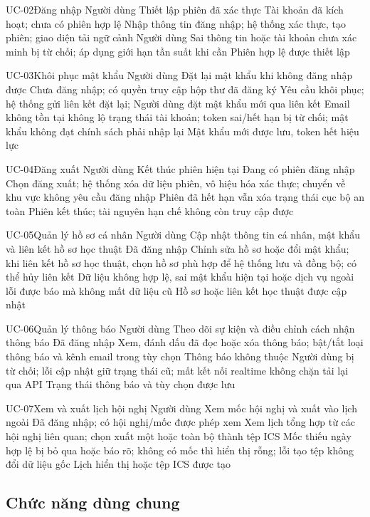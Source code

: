 \UseCaseSpec
{UC-02}{Đăng nhập}
{Người dùng}
{Thiết lập phiên đã xác thực}
{Tài khoản đã kích hoạt; chưa có phiên hợp lệ}
{Nhập thông tin đăng nhập; hệ thống xác thực, tạo phiên; giao diện tải ngữ cảnh Người dùng}
{Sai thông tin hoặc tài khoản chưa xác minh bị từ chối; áp dụng giới hạn tần suất khi cần}
{Phiên hợp lệ được thiết lập}

\UseCaseSpec
{UC-03}{Khôi phục mật khẩu}
{Người dùng}
{Đặt lại mật khẩu khi không đăng nhập được}
{Chưa đăng nhập; có quyền truy cập hộp thư đã đăng ký}
{Yêu cầu khôi phục; hệ thống gửi liên kết đặt lại; Người dùng đặt mật khẩu mới qua liên kết}
{Email không tồn tại không lộ trạng thái tài khoản; token sai/hết hạn bị từ chối; mật khẩu không đạt chính sách phải nhập lại}
{Mật khẩu mới được lưu, token hết hiệu lực}

\UseCaseSpec
{UC-04}{Đăng xuất}
{Người dùng}
{Kết thúc phiên hiện tại}
{Đang có phiên đăng nhập}
{Chọn đăng xuất; hệ thống xóa dữ liệu phiên, vô hiệu hóa xác thực; chuyển về khu vực không yêu cầu đăng nhập}
{Phiên đã hết hạn vẫn xóa trạng thái cục bộ an toàn}
{Phiên kết thúc; tài nguyên hạn chế không còn truy cập được}

\UseCaseSpec
{UC-05}{Quản lý hồ sơ cá nhân}
{Người dùng}
{Cập nhật thông tin cá nhân, mật khẩu và liên kết hồ sơ học thuật}
{Đã đăng nhập}
{Chỉnh sửa hồ sơ hoặc đổi mật khẩu; khi liên kết hồ sơ học thuật, chọn hồ sơ phù hợp để hệ thống lưu và đồng bộ; có thể hủy liên kết}
{Dữ liệu không hợp lệ, sai mật khẩu hiện tại hoặc dịch vụ ngoài lỗi được báo mà không mất dữ liệu cũ}
{Hồ sơ hoặc liên kết học thuật được cập nhật}

\UseCaseSpec
{UC-06}{Quản lý thông báo}
{Người dùng}
{Theo dõi sự kiện và điều chỉnh cách nhận thông báo}
{Đã đăng nhập}
{Xem, đánh dấu đã đọc hoặc xóa thông báo; bật/tắt loại thông báo và kênh email trong tùy chọn}
{Thông báo không thuộc Người dùng bị từ chối; lỗi cập nhật giữ trạng thái cũ; mất kết nối realtime không chặn tải lại qua API}
{Trạng thái thông báo và tùy chọn được lưu}

\UseCaseSpec
{UC-07}{Xem và xuất lịch hội nghị}
{Người dùng}
{Xem mốc hội nghị và xuất vào lịch ngoài}
{Đã đăng nhập; có hội nghị/mốc được phép xem}
{Xem lịch tổng hợp từ các hội nghị liên quan; chọn xuất một hoặc toàn bộ thành tệp ICS}
{Mốc thiếu ngày hợp lệ bị bỏ qua hoặc báo rõ; không có mốc thì hiển thị rỗng; lỗi tạo tệp không đổi dữ liệu gốc}
{Lịch hiển thị hoặc tệp ICS được tạo}


\subsection{Chức năng dùng chung}

